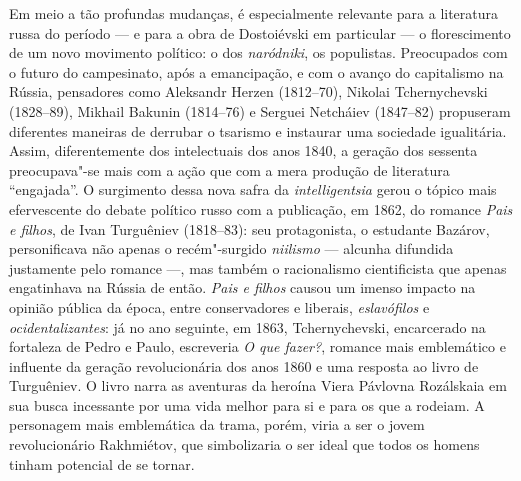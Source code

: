Em meio a tão profundas mudanças, é especialmente relevante para a literatura
russa do período --- e para a obra de Dostoiévski em particular --- o florescimento
de um novo movimento político: o dos \textit{naródniki}, os populistas.
Preocupados com o futuro do campesinato, após a emancipação, e com o avanço do
capitalismo na Rússia, pensadores como Aleksandr Herzen (1812--70), Nikolai
Tchernychevski (1828--89), Mikhail Bakunin (1814--76) e Serguei Netcháiev
(1847--82) propuseram diferentes maneiras de derrubar o tsarismo e instaurar uma
sociedade igualitária. Assim, diferentemente dos intelectuais dos anos 1840, 
a geração dos sessenta preocupava"-se mais com a ação que com a mera
produção de literatura “engajada”. O surgimento dessa nova safra da
\textit{intelligentsia} gerou o tópico mais efervescente do debate político
russo com a publicação, em 1862, do romance \textit{Pais e filhos}, de Ivan
Turguêniev (1818--83): seu protagonista, o estudante Bazárov, personificava não
apenas o recém"-surgido \textit{niilismo} --- alcunha difundida justamente pelo
romance ---, mas também o racionalismo cientificista que apenas engatinhava na
Rússia de então. \textit{Pais e filhos} causou um imenso impacto na opinião
pública da época, entre conservadores e liberais, \textit{eslavófilos} e
\textit{ocidentalizantes}: já no ano seguinte, em 1863, Tchernychevski,
encarcerado na fortaleza de Pedro e Paulo, escreveria \textit{O que fazer?},
romance mais emblemático e influente da geração revolucionária dos anos 1860 e
uma resposta ao livro de Turguêniev. O livro narra as aventuras da heroína
Viera Pávlovna Rozálskaia em sua busca incessante por uma vida melhor para si e
para os que a rodeiam. A personagem mais emblemática da trama, porém, viria a
ser o jovem revolucionário Rakhmiétov, que simbolizaria o ser ideal que todos
os homens tinham potencial de se tornar.

